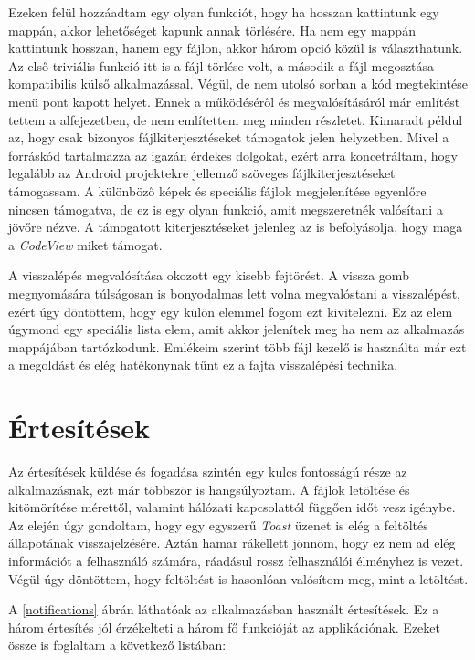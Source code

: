 \documentclass{thesis-ekf}
\theoremstyle{definition}
\theoremstyle{remark}
\begin{document}
Ezeken felül hozzáadtam egy olyan funkciót, hogy ha hosszan kattintunk egy mappán, akkor lehetőséget kapunk annak törlésére.
Ha nem egy mappán kattintunk hosszan, hanem egy fájlon, akkor három opció közül is választhatunk.
Az első triviális funkció itt is a fájl törlése volt, a második a fájl megosztása kompatibilis külső alkalmazással.
Végül, de nem utolsó sorban a kód megtekintése menü pont kapott helyet.
Ennek a működéséről és megvalósításáról már említést tettem a  alfejezetben, de nem említettem meg minden részletet.
Kimaradt példul az, hogy csak bizonyos fájlkiterjesztéseket támogatok jelen helyzetben.
Mivel a forráskód tartalmazza az igazán érdekes dolgokat, ezért arra koncetráltam, hogy legalább az Android projektekre jellemző szöveges fájlkiterjesztéseket támogassam.
A különböző képek és speciális fájlok megjelenítése egyenlőre nincsen támogatva, de ez is egy olyan funkció, amit megszeretnék valósítani a jövőre nézve.
A támogatott kiterjesztéseket jelenleg az is befolyásolja, hogy maga a \emph{CodeView} miket támogat.

A visszalépés megvalósítása okozott egy kisebb fejtörést.
A vissza gomb megnyomására túlságosan is bonyodalmas lett volna megvalóstani a visszalépést, ezért úgy döntöttem, hogy egy külön elemmel fogom ezt kivitelezni.
Ez az elem úgymond egy speciális lista elem, amit akkor jelenítek meg ha nem az alkalmazás mappájában tartózkodunk.
Emlékeim szerint több fájl kezelő is használta már ezt a megoldást és elég hatékonynak tűnt ez a fajta visszalépési technika.

\section{Értesítések}\label{ertesitesek}

Az értesítések küldése és fogadása szintén egy kulcs fontosságú része az alkalmazásnak, ezt már többször is hangsúlyoztam.
A fájlok letöltése és kitömörítése mérettől, valamint hálózati kapcsolattól függően időt vesz igénybe.
Az elején úgy gondoltam, hogy egy egyszerű \emph{Toast} üzenet is elég a feltöltés állapotának visszajelzésére.
Aztán hamar rákellett jönnöm, hogy ez nem ad elég információt a felhasználó számára, ráadásul rossz felhasználói élményhez is vezet.
Végül úgy döntöttem, hogy feltöltést is hasonlóan valósítom meg, mint a letöltést.

A \ref{notifications} ábrán láthatóak az alkalmazásban használt értesítések.
Ez a három értesítés jól érzékelteti a három fő funkcióját az applikációnak.
Ezeket össze is foglaltam a következő listában:
\end{document}
